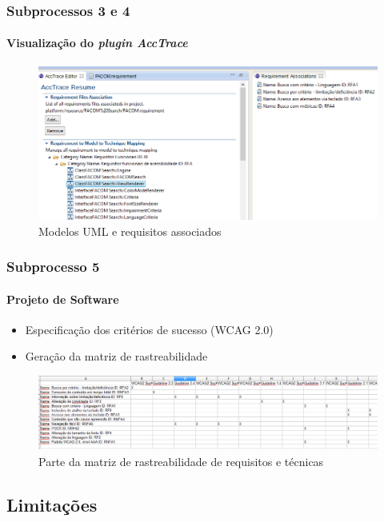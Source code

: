 \documentclass{beamer}
\begin{document}
\begin{frame}
\frametitle{Subprocessos 3 e 4}
\framesubtitle{Visualização do \textit{plugin AccTrace}}

\begin{figure}[htbp] \centering
	\includegraphics[width=\textwidth,height=.65\textheight,keepaspectratio]{./img/referenciascriadas.png}
	\caption{Modelos UML e requisitos associados}
	\label{fig:referenciascriadas}
\end{figure}

\end{frame}

\begin{frame}
\frametitle{Subprocesso 5}
\framesubtitle{Projeto de Software}

\begin{itemize}
  \item Especificação dos critérios de sucesso (WCAG 2.0)
  \item Geração da matriz de rastreabilidade
\end{itemize}

\begin{figure}[htbp] \centering
	\includegraphics[width=\textwidth,height=.65\textheight,keepaspectratio]{./img/reqtec.png}
	\caption{Parte da matriz de rastreabilidade de requisitos e técnicas}
	\label{fig:reqtec}
\end{figure}

\end{frame}

\subsection[Limitações]{Limitações}
\end{document}
